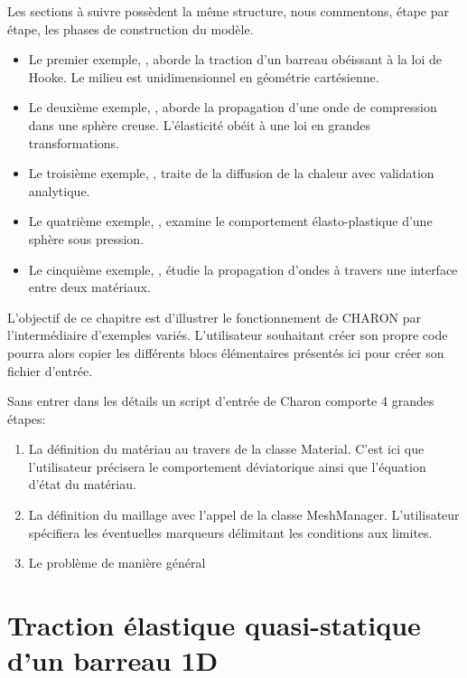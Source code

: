 \documentclass[10pt]{book}
\begin{document}
Les sections à suivre possèdent la même structure, nous commentons, étape par étape, les phases de construction du modèle.

\begin{itemize}[label = $\star$]
\item Le premier exemple, , aborde la traction d'un barreau obéissant à la loi de Hooke. Le milieu est unidimensionnel en géométrie cartésienne.
\item Le deuxième exemple, , aborde la propagation d'une onde de compression dans une sphère creuse. L'élasticité obéit à une loi en grandes transformations.
\item Le troisième exemple, , traite de la diffusion de la chaleur avec validation analytique.
\item Le quatrième exemple, , examine le comportement élasto-plastique d'une sphère sous pression.
\item Le cinquième exemple, , étudie la propagation d'ondes à travers une interface entre deux matériaux.
\end{itemize}

L'objectif de ce chapitre est d'illustrer le fonctionnement de CHARON par l'intermédiaire d'exemples variés. L'utilisateur souhaitant créer son propre code pourra alors copier les différents blocs élémentaires présentés ici pour créer son fichier d'entrée.

Sans entrer dans les détails un script d'entrée de Charon comporte 4 grandes étapes:
\begin{enumerate}
\item La définition du matériau au travers de la classe Material. C'est ici que l'utilisateur précisera le comportement déviatorique ainsi que l'équation d'état du matériau.
\item La définition du maillage avec l'appel de la classe MeshManager. L'utilisateur spécifiera les éventuelles marqueurs délimitant les conditions aux limites.
\item Le problème de manière général
\end{enumerate}
\clearpage
\section{Traction élastique quasi-statique d'un barreau 1D}\label{Section:Traction élastique quasi-statique d'un barreau 1D}
\end{document}

